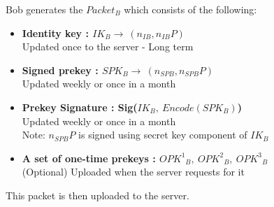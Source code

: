 \documentclass[11pt]{article}
\begin{document}
Bob generates the ${Packet}_B$ which consists of the following:
\begin{itemize}
    \item \textbf{Identity key : ${IK}_B \rightarrow \ (n_{IB}, n_{IB}P)$}\\
    Updated once to the server - Long term
    \item \textbf{Signed prekey : ${SPK}_B \rightarrow \ (n_{SPB}, n_{SPB}P)$}\\
    Updated weekly or once in a month
    \item \textbf{Prekey Signature : Sig(${IK}_B,\ Encode({SPK}_B)$)}\\
    Updated weekly or once in a month\\
     Note: $n_{SPB}P$ is signed using secret key component of ${IK}_B$
    \item \textbf{A set of one-time prekeys : ${{OPK}^1}_B,\ {{OPK}^2}_B,\ {{OPK}^3}_B$}\\
    (Optional) Uploaded when the server requests for it
\end{itemize}
This packet is then uploaded to the server.\\
\end{document}
